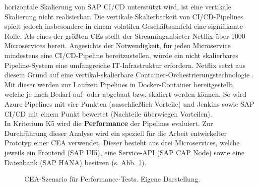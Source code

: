 horizontale Skalierung von SAP CI/CD unterstützt wird, ist eine vertikale Skalierung nicht realisierbar. Die vertikale Skalierbarkeit von CI/CD-Pipelines spielt jedoch insbesondere in einem volatilen Geschäftsumfeld eine signifikante Rolle. Als eines der größten CEs stellt der Streaminganbieter Netflix über 1000 Microservices bereit. Angesichts der Notwendigkeit, für jeden Microservice mindestens eine CI/CD-Pipeline bereitzustellen, würde ein nicht skalierbares Pipeline-System eine umfangreiche IT-Infrastruktur erfordern. Netflix setzt aus diesem Grund auf eine vertikal-skalierbare Container-Orchestrierungstechnologie \cite{Blog.20170419}\cite{CloudZero.20230419}. Mit dieser werden zur Laufzeit Pipelines in Docker-Container bereitgestellt, welche je nach Bedarf auf- oder abgebaut bzw. skaliert werden können. So wird Azure Pipelines mit vier Punkten (ausschließlich Vorteile) und Jenkins sowie SAP CI/CD mit einem Punkt bewertet (Nachteile überwiegen Vorteilen).\\ In Kriterium K5 wird die \textbf{Performance} der Pipelines evaluiert. Zur Durchführung dieser Analyse wird ein speziell für die Arbeit entwickelter Prototyp einer CEA verwendet. Dieser besteht aus drei Microservices, welche jeweils ein Frontend (SAP UI5), eine Service-API (SAP CAP Node) sowie eine Datenbank (SAP HANA) besitzen (s. Abb. \ref{fig:Szenario}).
 \begin{center}
	\begin{figure}[H]
		\centering
		\caption[CEA-Szenario für Performance-Tests]{CEA-Szenario für Performance-Tests. Eigene Darstellung.}
		\label{fig:Szenario}
	\end{figure}
\end{center}
\vspace*{-15mm}
